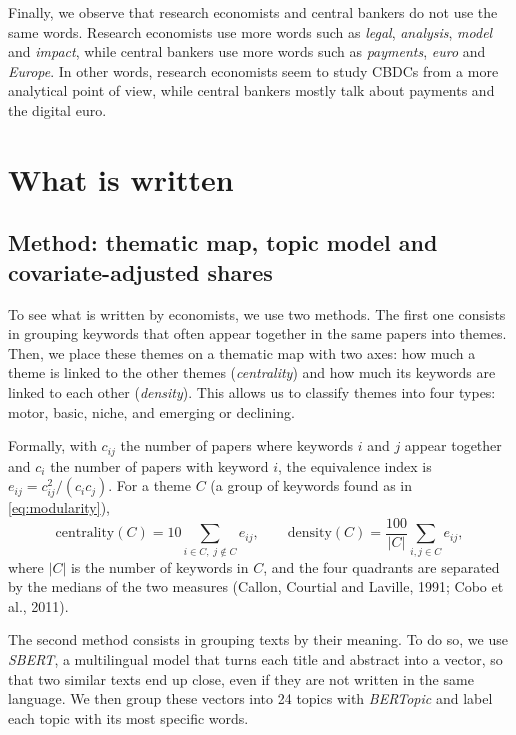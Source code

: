 \documentclass[11pt,a4paper]{article}
\begin{document}
Finally, we observe that research economists and central bankers do not use the same words. Research economists 
use more words such as \emph{legal}, \emph{analysis}, \emph{model} and \emph{impact}, while central bankers use 
more words such as \emph{payments}, \emph{euro} and \emph{Europe}. In other words, research economists seem to 
study CBDCs from a more analytical point of view, while central bankers mostly talk about payments and the 
digital euro.


\section{What is written}\label{sec:what}
\subsection{Method: thematic map, topic model and covariate-adjusted shares}

To see what is written by economists, we use two methods. The first one consists in 
grouping keywords that often appear together in the same papers into themes. Then, we 
place these themes on a thematic map with two axes: how much a theme is linked to the 
other themes (\emph{centrality}) and how much its keywords are linked to each other 
(\emph{density}). This allows us to classify themes into four types: motor, basic, niche, 
and emerging or declining. 

Formally, with $c_{ij}$ the number of papers where keywords $i$ and $j$ appear together and $c_i$ the number of papers with keyword $i$, the equivalence index is $e_{ij} = c_{ij}^2/(c_i c_j)$. For a theme $C$ (a group of keywords found as in \cref{eq:modularity}),
\begin{equation}\label{eq:callon}
\text{centrality}(C) = 10\!\!\sum_{i\in C,\; j\notin C}\!\! e_{ij},
\qquad
\text{density}(C) = \frac{100}{|C|}\sum_{i,j\in C} e_{ij},
\end{equation}
where $|C|$ is the number of keywords in $C$, and the four quadrants are separated by the medians of the two measures (Callon, Courtial and Laville, 1991; Cobo et al., 2011).


The second method consists in grouping texts by their meaning. To do so, we use \emph{SBERT}, 
a multilingual model that turns each title and abstract into a vector, so that two similar texts 
end up close, even if they are not written in the same language. We then group 
these vectors into 24 topics with \emph{BERTopic} and label each topic with its most specific words.
\end{document}
